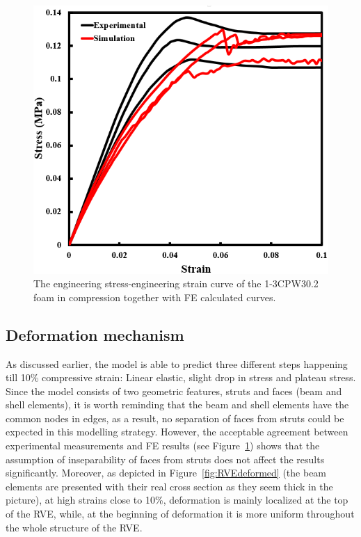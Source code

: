 \documentclass[review]{elsarticle}
\begin{document}
\begin{figure}[hb]
  \centering
  \includegraphics[scale=0.6]{StressStrainCurveExpFem}
  \captionsetup{justification=centering}
  \caption[Close up of \textit{Hemidactylus} sp. ]
   {The engineering stress-engineering strain curve of the 1-3CPW30.2 foam in compression together with FE calculated curves.}
  \label{fig:StressStrainCurveExpFem}
\end{figure} 

\subsection{Deformation mechanism}
As discussed earlier, the model is able to predict three different steps happening till 10\% compressive strain: Linear elastic, slight drop in stress and plateau stress. Since the model consists of two geometric features, struts and faces (beam and shell elements), it is worth reminding that the beam and shell elements have the common nodes in edges, as a result, no separation of faces from struts could be expected in this modelling strategy. However, the acceptable agreement between experimental measurements and FE results (see Figure~\ref{fig:StressStrainCurveExpFem}) shows that the assumption of inseparability of faces from struts does not affect the results significantly. Moreover, as depicted in Figure~\ref{fig:RVEdeformed} (the beam elements are presented with their real cross section as they seem thick in the picture), at high strains close to 10\%, deformation is mainly localized at the top of the RVE, while, at the beginning of deformation it is more uniform throughout the whole structure of the RVE.
\end{document}
